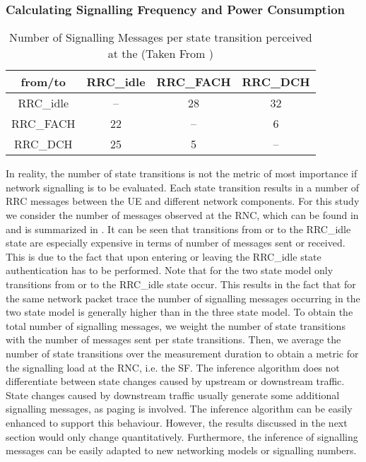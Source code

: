 \subsubsection*{Calculating Signalling Frequency and Power Consumption}\label{sec:network:network_traces:calculating_metrics}

\begin{table}\centering
\centering
\begin{tabular}{cccc}
	\toprule
    from/to & \gls{RRC_idle} & \gls{RRC_FACH} & \gls{RRC_DCH}\\
    \midrule
    \gls{RRC_idle} & -- & 28 & 32\\
    \gls{RRC_FACH} & 22 & -- & 6\\
    \gls{RRC_DCH} & 25 & 5 & --\\
    \bottomrule    
	\end{tabular}
  \caption{Number of Signalling Messages per  state transition perceived at the  (Taken From \cite{3GPP_RRC_Spec})}
  \label{tab:network:network_traces:calculating_metrics:signalling_messages}
\end{table}

In reality, the number of state transitions is not the metric of most importance if network signalling is to be evaluated.
Each state transition results in a number of \gls{RRC} messages between the \gls{UE} and different network components.
For this study we consider the number of messages observed at the \gls{RNC}, which can be found in \cite{3GPP_RRC_Spec} and is summarized in .
It can be seen that transitions from or to the \gls{RRC_idle} state are especially expensive in terms of number of messages sent or received.
This is due to the fact that upon entering or leaving the \gls{RRC_idle} state authentication has to be performed. 
Note that for the two state model only transitions from or to the \gls{RRC_idle} state occur.
This results in the fact that for the same network packet trace the number of signalling messages occurring in the two state model is generally higher than in the three state model.
To obtain the total number of signalling messages, we weight the number of state transitions with the number of messages sent per state transitions.
Then, we average the number of state transitions over the measurement duration to obtain a metric for the signalling load at the \gls{RNC}, i.e. the \gls{SF}.
The inference algorithm does not differentiate between state changes caused by upstream or downstream traffic.
State changes caused by downstream traffic usually generate some additional signalling messages, as paging is involved.
The inference algorithm can be easily enhanced to support this behaviour.
However, the results discussed in the next section would only change quantitatively.
Furthermore, the inference of signalling messages can be easily adapted to new networking models or signalling numbers.

